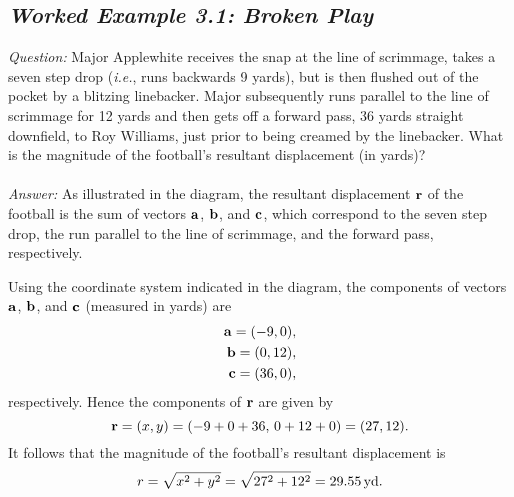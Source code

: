 \subsection*{\em Worked Example 3.1: Broken Play}
{\em Question:} Major Applewhite receives the snap at the line
of scrimmage, takes a seven step drop ({\em i.e.}, runs backwards
9 yards), but is then flushed out of the pocket by a blitzing
linebacker. Major subsequently runs parallel to the line of scrimmage
for 12 yards and then gets off a forward pass, 36 yards straight downfield, to
Roy Williams, just prior to being creamed by the linebacker. What is the magnitude
of the football's resultant displacement (in yards)?\\
~\\
{\em Answer:} As illustrated in the diagram, the resultant displacement ${\bf r}$ of the
football is the  sum of vectors ${\bf a}$, ${\bf b}$, and ${\bf c}$, which
correspond to the seven step drop, the run parallel to the line of
scrimmage, and the forward pass, respectively.
\begin{figure*}[h]
\epsfysize=2in
\centerline{}
\end{figure*}
Using the coordinate system indicated in the diagram, the components of
vectors ${\bf a}$, ${\bf b}$, and ${\bf c}$ (measured in yards) are
\begin{eqnarray}
{\bf a} = (-9,0),\nonumber\\
{\bf b} = (0,12),\nonumber\\
{\bf c} = (36, 0),\nonumber
\end{eqnarray}
respectively. Hence the components of ${\bf r}$ are given by
$$
{\bf r} = (x,y)= (-9+0+36,\,0+12+0) = (27, 12).
$$
It follows that the magnitude of the football's resultant displacement is
$$
r = \sqrt{x^2+y^2} = \sqrt{27^2+12^2} = 29.55\,{\rm yd}.
$$


